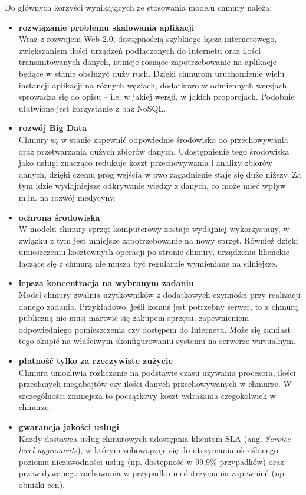 \documentclass[12pt,a4paper,twoside,titlepage,openright]{book}
\begin{document}
Do głównych korzyści wynikających ze stosowania modelu chmury należą:
\begin{itemize}
\item \textbf{rozwiązanie problemu skalowania aplikacji }\\
Wraz z rozwojem Web 2.0, dostępnością szybkiego łącza internetowego, zwiększaniem ilości urządzeń podłączonych do Internetu oraz ilości transmitowanych danych, istnieje rosnące zapotrzebowanie na aplikacje będące w stanie obsłużyć duży ruch. Dzięki chmurom uruchomienie wielu instancji aplikacji na różnych węzłach, dodatkowo w odmiennych wersjach, sprowadza się do opisu -- ile, w jakiej wersji, w jakich proporcjach.\cite{kubernetesOreily} Podobnie ułatwione jest korzystanie z baz NoSQL.

\item \textbf{rozwój Big Data} \\
Chmury są w stanie zapewnić odpowiednie środowisko do przechowywania oraz przetwarzania dużych zbiorów danych. Udostępnienie tego środowiska jako usługi znacząco redukuje koszt przechowywania i analizy zbiorów danych, dzięki czemu próg wejścia w owo zagadnienie staje się dużo niższy. Za tym idzie wydajniejsze odkrywanie wiedzy z danych, co może mieć wpływ m.in. na rozwój medycyny.

\item \textbf{ochrona środowiska} \\
W modelu chmury sprzęt komputerowy zostaje wydajniej wykorzystany, w związku z tym jest mniejsze zapotrzebowanie na nowy sprzęt. Również dzięki umieszczeniu kosztownych operacji po stronie chmury, urządzenia klienckie łączące się z chmurą nie muszą być regularnie wymieniane na silniejsze.

\item \textbf{lepsza koncentracja na wybranym zadaniu} \\
Model chmury zwalnia użytkowników z dodatkowych czynności przy realizacji danego zadania. Przykładowo, jeśli komuś jest potrzebny serwer, to z chmurą publiczną nie musi martwić się zakupem sprzętu, zapewnieniem odpowiedniego pomieszczenia czy dostępem do Internetu. Może się zamiast tego skupić na właściwym skonfigurowaniu systemu na serwerze wirtualnym. 

\item \textbf{płatność tylko za rzeczywiste zużycie} \\
Chmura umożliwia rozliczanie na podstawie czasu używania procesora, ilości przesłanych megabajtów czy ilości danych przechowywanych w chmurze. W szczególności zmniejsza to początkowy koszt wdrażania czegokolwiek w chmurze.

\item \textbf{gwarancja jakości usługi} \\
Każdy dostawca usług chmurowych udostępnia klientom SLA (ang. \textit{Service-level aggrements}), w którym zobowiązuje się do utrzymania określonego poziomu niezawodności usług (np. dostępność w 99,9\% przypadków) oraz przewidywanego zachowania w przypadku niedotrzymania zapewnień (np. obniżki cen).

\end{itemize}
\end{document}
